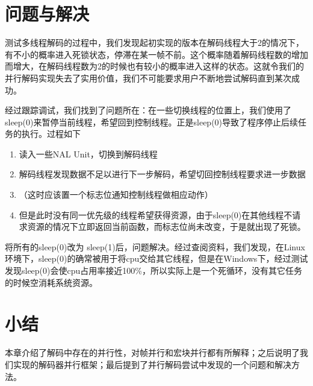 \section{问题与解决}
\label{sec:parallelbuganddebug}

测试多线程解码的过程中，我们发现起初实现的版本在解码线程大于2的情况下，有不小的概率进入死锁状态，停滞在某一帧不前。这个概率随着解码线程数的增加而增大，在解码线程数为2的时候也有较小的概率进入这样的状态。这就令我们的并行解码实现失去了实用价值，我们不可能要求用户不断地尝试解码直到某次成功。

经过跟踪调试，我们找到了问题所在：在一些切换线程的位置上，我们使用了sleep(0)来暂停当前线程，希望回到控制线程。正是sleep(0)导致了程序停止后续任务的执行。过程如下
\begin{enumerate}
\item 读入一些NAL Unit，切换到解码线程
\item 解码线程发现数据不足以进行下一步解码，希望切回控制线程要求进一步数据
\item （这时应该置一个标志位通知控制线程做相应动作）
\item 但是此时没有同一优先级的线程希望获得资源，由于sleep(0)在其他线程不请求资源的情况下立即返回当前函数，而标志位尚未改变，于是就出现了死锁。
\end{enumerate}

将所有的sleep(0)改为 sleep(1)后，问题解决。经过查阅资料，我们发现，在Linux环境下，sleep(0)的确常被用于将cpu交给其它线程，但是在Windows下，经过测试发现sleep(0)会使cpu占用率接近100\%，所以实际上是一个死循环，没有其它任务的时候空消耗系统资源。

\section{小结}
\label{sec:sum5}

本章介绍了解码中存在的并行性，对帧并行和宏块并行都有所解释；之后说明了我们实现的解码器并行框架；最后提到了并行解码尝试中发现的一个问题和解决方法。

\cleardoublepage